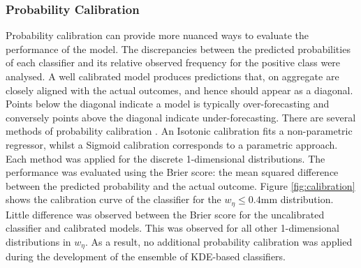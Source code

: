 \subsubsection{Probability Calibration}


Probability calibration can provide more nuanced ways to evaluate the performance of the model. The discrepancies between the predicted probabilities of each classifier and its relative observed frequency for the positive class were analysed. A well calibrated model produces predictions that, on aggregate are closely aligned with the actual outcomes, and hence should appear as a diagonal. Points below the diagonal indicate a model is typically over-forecasting and conversely points above the diagonal indicate under-forecasting. There are several methods of probability calibration \cite{prob-calibration}. An Isotonic calibration fits a non-parametric regressor, whilst a Sigmoid calibration corresponds to a parametric approach. Each method was applied for the discrete 1-dimensional distributions. The performance was evaluated using the Brier score: the mean squared difference between the predicted probability and the actual outcome. Figure \ref{fig:calibration} shows the calibration curve of the classifier for the $w_{\eta} \leq 0.4$mm distribution. Little difference was observed between the Brier score for the uncalibrated classifier and calibrated models. This was observed for all other 1-dimensional distributions in $w_{\eta}$. As a result, no additional probability calibration was applied during the development of the ensemble of KDE-based classifiers.


